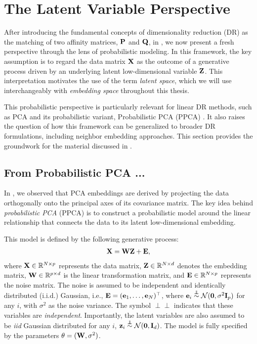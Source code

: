 \section{The Latent Variable Perspective}\label{sec:dr_proba_modelling}

After introducing the fundamental concepts of dimensionality reduction (DR) as the matching of two affinity matrices, ${\mathbf{P}}$ and ${\mathbf{Q}}$, in , we now present a fresh perspective through the lens of probabilistic modeling. In this framework, the key assumption is to regard the data matrix ${\mathbf{X}}$ as the outcome of a generative process driven by an underlying latent low-dimensional variable ${\mathbf{Z}}$. This interpretation motivates the use of the term \emph{latent space}, which we will use interchangeably with \emph{embedding space} throughout this thesis.

This probabilistic perspective is particularly relevant for linear DR methods, such as PCA and its probabilistic variant, Probabilistic PCA (PPCA) \citep{tipping1999probabilistic}. It also raises the question of how this framework can be generalized to broader DR formulations, including neighbor embedding approaches. This section provides the groundwork for the material discussed in .

\subsection{From Probabilistic PCA ...}\label{sec:ppca}

In , we observed that PCA embeddings are derived by projecting the data orthogonally onto the principal axes of its covariance matrix. The key idea behind \emph{probabilistic PCA} (PPCA) is to construct a probabilistic model around the linear relationship that connects the data to its latent low-dimensional embedding.

This model is defined by the following generative process:
\begin{align}\label{eq:ppca_linear}
    {\mathbf{X}} = {\mathbf{W}} {\mathbf{Z}} + {\mathbf{E}},
\end{align}
where ${\mathbf{X}} \in \mathbb{R}^{N \times p}$ represents the data matrix, ${\mathbf{Z}} \in \mathbb{R}^{N \times d}$ denotes the embedding matrix, ${\mathbf{W}} \in \mathbb{R}^{p \times d}$ is the linear transformation matrix, and ${\mathbf{E}} \in \mathbb{R}^{N \times p}$ represents the noise matrix. The noise is assumed to be independent and identically distributed (i.i.d.) Gaussian, i.e., ${\mathbf{E}} = ({\mathbf{e}}_1, \ldots, {\mathbf{e}}_N)^\top$, where ${\mathbf{e}}_i \stackrel{\perp\!\!\!\!\perp}{\sim} \mathcal{N}(\bm{0}, \sigma^2 {\mathbf{I}}_p)$ for any $i$, with $\sigma^2$ as the noise variance. The symbol $\perp\!\!\!\!\perp$ indicates that these variables are \emph{independent}. Importantly, the latent variables are also assumed to be \emph{iid} Gaussian distributed \ie for any $i$, ${\mathbf{z}}_i \stackrel{\perp\!\!\!\!\perp}{\sim} \mathcal{N}(\bm{0}, {\mathbf{I}}_d)$. The model is fully specified by the parameters $\theta = ({\mathbf{W}}, \sigma^2)$.

